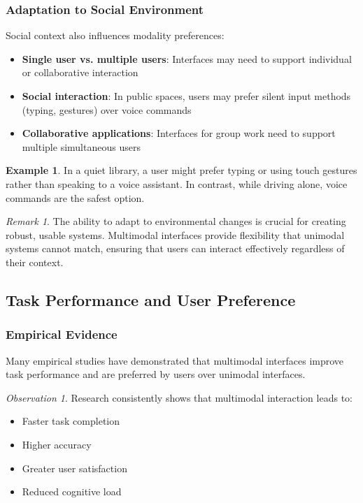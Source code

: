 \documentclass[11pt,a4paper]{article}
\theoremstyle{definition}
\newtheorem{example}{Example}[section]
\theoremstyle{plain}
\theoremstyle{remark}
\newtheorem*{remark}{Remark}
\newtheorem*{observation}{Observation}
\begin{document}
\subsubsection{Adaptation to Social Environment}

Social context also influences modality preferences:

\begin{itemize}
    \item \textbf{Single user vs. multiple users}: Interfaces may need to support individual or collaborative interaction
    \item \textbf{Social interaction}: In public spaces, users may prefer silent input methods (typing, gestures) over voice commands
    \item \textbf{Collaborative applications}: Interfaces for group work need to support multiple simultaneous users
\end{itemize}

\begin{example}
In a quiet library, a user might prefer typing or using touch gestures rather than speaking to a voice assistant. In contrast, while driving alone, voice commands are the safest option.
\end{example}

\begin{remark}
The ability to adapt to environmental changes is crucial for creating robust, usable systems. Multimodal interfaces provide flexibility that unimodal systems cannot match, ensuring that users can interact effectively regardless of their context.
\end{remark}

\subsection{Task Performance and User Preference}

\subsubsection{Empirical Evidence}

Many empirical studies have demonstrated that multimodal interfaces improve task performance and are preferred by users over unimodal interfaces.

\begin{observation}
Research consistently shows that multimodal interaction leads to:
\begin{itemize}
    \item Faster task completion
    \item Higher accuracy
    \item Greater user satisfaction
    \item Reduced cognitive load
\end{itemize}
\end{observation}
\end{document}
